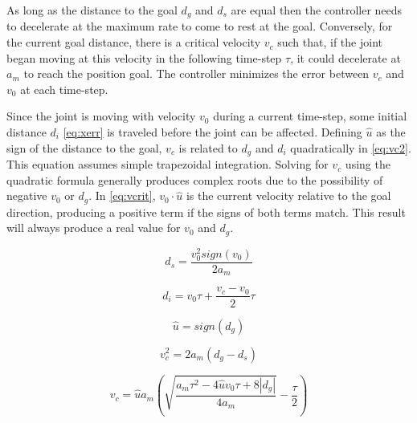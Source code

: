 As long as the distance to the goal $d_g$ and $d_s$ are equal 
then the controller needs to decelerate at the maximum rate to come to rest at the goal.
Conversely, for the current goal distance, there is a critical velocity $v_c$
such that, if the joint began moving at this velocity in the following
time-step $\tau$, it could decelerate at $a_m$ to reach the position goal.
The controller minimizes the error between $v_c$ and $v_0$ at each time-step.

Since the joint is moving with velocity $v_0$ during a current time-step, some
initial distance $d_{i}$ \eqref{eq:xerr} is traveled before the joint can be
affected. Defining $\hat{u}$ as the sign of the distance to the goal, $v_c$ is
related to $d_g$ and $d_i$ quadratically in \eqref{eq:vc2}. This equation
assumes simple trapezoidal integration. Solving for $v_c$ using the quadratic
formula generally produces complex roots due to the possibility of negative
$v_0$ or $d_g$.  In \eqref{eq:vcrit}, $v_0\cdot\hat{u}$ is the current velocity
relative to the goal direction, producing a positive term if the signs of both
terms match. This result will always produce a real value for $v_0$ and $d_g$.

\begin{equation}
\label{eq:decdist}
d_s=\frac{v_0^2 sign(v_0)}{2 a_m}
\end{equation}

\begin{equation}
\label{eq:xerr}
d_{i}=v_0 \tau + \frac{v_c-v_0}{2}\tau
\end{equation}

\begin{equation}
\label{eq:uhat}
\hat{u}=sign(d_g)
\end{equation}


\begin{equation}
\label{eq:vc2}
v_c^2 = 2 a_m \left(d_g -d_{s} \right)
\end{equation}

\begin{equation}
\label{eq:vcrit}
v_c=\hat{u} a_m \left(\sqrt{\frac{a_m \tau^2 - 4 \hat{u} v_0 \tau+8 |d_g|}{4 a_m}} - \frac{ \tau }{2}\right)
\end{equation}
